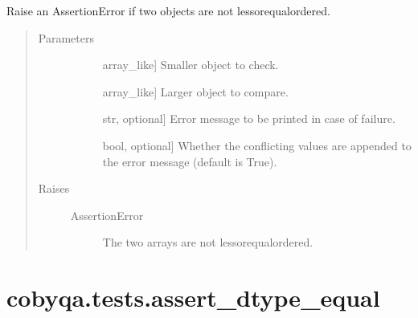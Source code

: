 \documentclass[letterpaper,10pt,english]{sphinxmanual}
\begin{document}
\begin{fulllineitems}
\label{\detokenize{refs/generated/cobyqa.tests.assert_array_less_equal:cobyqa.tests.assert_array_less_equal}}
\sphinxAtStartPar
Raise an AssertionError if two objects are not less\sphinxhyphen{}or\sphinxhyphen{}equal\sphinxhyphen{}ordered.
\begin{quote}\begin{description}
\item[{Parameters}] \leavevmode\begin{description}
\item[{}] \leavevmode{[}array\_like{]}
\sphinxAtStartPar
Smaller object to check.

\item[{}] \leavevmode{[}array\_like{]}
\sphinxAtStartPar
Larger object to compare.

\item[{}] \leavevmode{[}str, optional{]}
\sphinxAtStartPar
Error message to be printed in case of failure.

\item[{}] \leavevmode{[}bool, optional{]}
\sphinxAtStartPar
Whether the conflicting values are appended to the error message
(default is True).

\end{description}

\item[{Raises}] \leavevmode\begin{description}
\item[{AssertionError}] \leavevmode
\sphinxAtStartPar
The two arrays are not less\sphinxhyphen{}or\sphinxhyphen{}equal\sphinxhyphen{}ordered.

\end{description}

\end{description}\end{quote}

\end{fulllineitems}



\section{cobyqa.tests.assert\_dtype\_equal}
\label{\detokenize{refs/generated/cobyqa.tests.assert_dtype_equal:cobyqa-tests-assert-dtype-equal}}\label{\detokenize{refs/generated/cobyqa.tests.assert_dtype_equal::doc}}
\end{document}
